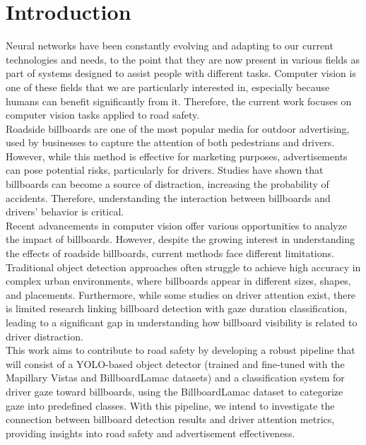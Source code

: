 \chapter*{Introduction}

Neural networks have been constantly evolving and adapting to our current technologies and needs, to the point that they are now present in various fields as part of systems designed to assist people with different tasks. Computer vision is one of these fields that we are particularly interested in, especially because humans can benefit significantly from it. Therefore, the current work focuses on computer vision tasks applied to road safety. \\

Roadside billboards are one of the most popular media for outdoor advertising, used by businesses to capture the attention of both pedestrians and drivers. However, while this method is effective for marketing purposes, advertisements can pose potential risks, particularly for drivers. Studies have shown that billboards can become a source of distraction, increasing the probability of accidents. Therefore, understanding the interaction between billboards and drivers’ behavior is critical. \\

Recent advancements in computer vision offer various opportunities to analyze the impact of billboards. However, despite the growing interest in understanding the effects of roadside billboards, current methods face different limitations. Traditional object detection approaches often struggle to achieve high accuracy in complex urban environments, where billboards appear in different sizes, shapes, and placements. Furthermore, while some studies on driver attention exist, there is limited research linking billboard detection with gaze duration classification, leading to a significant gap in understanding how billboard visibility is related to driver distraction. \\

This work aims to contribute to road safety by developing a robust pipeline that will consist of a YOLO-based object detector (trained and fine-tuned with the Mapillary Vistas and BillboardLamac datasets) and a classification system for driver gaze toward billboards, using the BillboardLamac dataset to categorize gaze into predefined classes. With this pipeline, we intend to investigate the connection between billboard detection results and driver attention metrics, providing insights into road safety and advertisement effectiveness. \\

